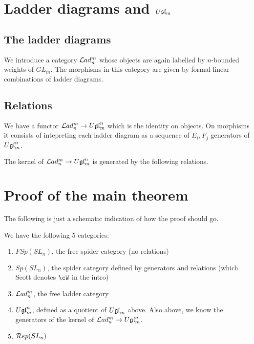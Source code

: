 \documentclass[11pt,leqno]{article}
\begin{document}
\section{Ladder diagrams and $U\mathfrak{sl}_{m}$}
\label{sec:ladders}

\subsection{The ladder diagrams}

We introduce a category $ \mathcal{L}ad_n^m $ whose objects are again labelled by $n$-bounded weights of $ GL_m$.  The morphisms in this category are given by formal linear combinations of ladder diagrams.


\subsection{Relations}
We have a functor $ \mathcal{L}ad_n^m \rightarrow U\mathfrak{gl}_{m}^n $ which is the identity on objects.  On morphisms it consists of intepreting each ladder diagram as a sequence of $ E_i, F_j $ generators of $ U\mathfrak{gl}_{m}^n $.

\begin{thm}
The kernel of $ \mathcal{L}ad_n^m \rightarrow U\mathfrak{gl}_{m}^n $ is generated by the following relations.
\end{thm}



\section{Proof of the main theorem}
\label{sec:theorem}

The following is just a schematic indication of how the proof should go.

We have the following 5 categories:
\begin{enumerate}
\item $FSp(SL_n) $, the free spider category (no relations)
\item $Sp(SL_n) $, the spider category defined by generators and relations (which Scott denotes $ \cW $ in the intro)
\item $\mathcal{L}ad_n^m$, the free ladder category
\item $U\mathfrak{gl}_{m}^n $, defined as a quotient of $ U\mathfrak{gl}_{m} $ above.  Also above, we know the generators of the kernel of $ \mathcal{L}ad_n^m \rightarrow U\mathfrak{gl}_{m}^n $.
\item $\mathcal{R}ep(SL_{n})$
\end{enumerate}
\end{document}
